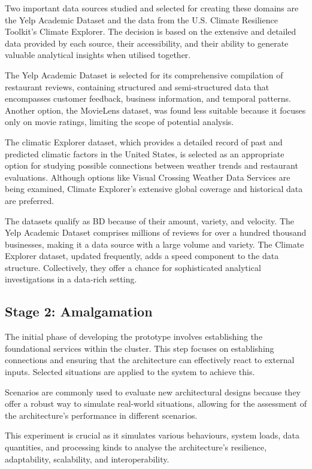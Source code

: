 \documentclass[journal]{IEEEtran}
\begin{document}
Two important data sources studied and selected for creating these domains are the Yelp Academic Dataset and the data from the U.S. Climate Resilience Toolkit's Climate Explorer. The decision is based on the extensive and detailed data provided by each source, their accessibility, and their ability to generate valuable analytical insights when utilised together.

The Yelp Academic Dataset is selected for its comprehensive compilation of restaurant reviews, containing structured and semi-structured data that encompasses customer feedback, business information, and temporal patterns. Another option, the MovieLens dataset, was found less suitable because it focuses only on movie ratings, limiting the scope of potential analysis.

The climatic Explorer dataset, which provides a detailed record of past and predicted climatic factors in the United States, is selected as an appropriate option for studying possible connections between weather trends and restaurant evaluations. Although options like Visual Crossing Weather Data Services are being examined, Climate Explorer's extensive global coverage and historical data are preferred.

The datasets qualify as BD because of their amount, variety, and velocity. The Yelp Academic Dataset comprises millions of reviews for over a hundred thousand businesses, making it a data source with a large volume and variety. The Climate Explorer dataset, updated frequently, adds a speed component to the data structure. Collectively, they offer a chance for sophisticated analytical investigations in a data-rich setting.

\subsection{Stage 2: Amalgamation}

The initial phase of developing the prototype involves establishing the foundational services within the cluster. This step focuses on establishing connections and ensuring that the architecture can effectively react to external inputs. Selected situations are applied to the system to achieve this. 

Scenarios are commonly used to evaluate new architectural designs because they offer a robust way to simulate real-world situations, allowing for the assessment of the architecture's performance in different scenarios. 

This experiment is crucial as it simulates various behaviours, system loads, data quantities, and processing kinds to analyse the architecture's resilience, adaptability, scalability, and interoperability. 
\end{document}
